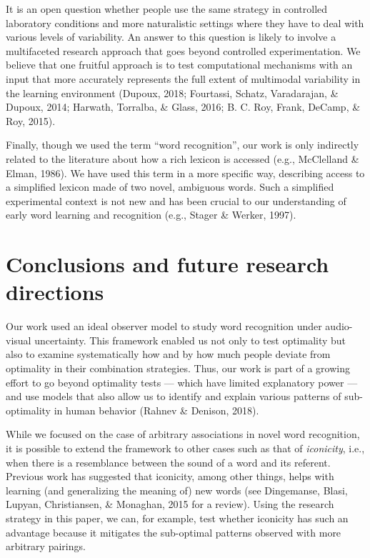 \documentclass[english,,man,floatsintext]{apa6}
\theoremstyle{definition}
\theoremstyle{definition}
\theoremstyle{definition}
\theoremstyle{remark}
\begin{document}
It is an open question whether people use the same strategy in
controlled laboratory conditions and more naturalistic settings where
they have to deal with various levels of variability. An answer to this
question is likely to involve a multifaceted research approach that goes
beyond controlled experimentation. We believe that one fruitful approach
is to test computational mechanisms with an input that more accurately
represents the full extent of multimodal variability in the learning
environment (Dupoux, 2018; Fourtassi, Schatz, Varadarajan, \& Dupoux,
2014; Harwath, Torralba, \& Glass, 2016; B. C. Roy, Frank, DeCamp, \&
Roy, 2015).

Finally, though we used the term \enquote{word recognition}, our work is
only indirectly related to the literature about how a rich lexicon is
accessed (e.g., McClelland \& Elman, 1986). We have used this term in a
more specific way, describing access to a simplified lexicon made of two
novel, ambiguous words. Such a simplified experimental context is not
new and has been crucial to our understanding of early word learning and
recognition (e.g., Stager \& Werker, 1997).

\section{Conclusions and future research
directions}\label{conclusions-and-future-research-directions}

Our work used an ideal observer model to study word recognition under
audio-visual uncertainty. This framework enabled us not only to test
optimality but also to examine systematically how and by how much people
deviate from optimality in their combination strategies. Thus, our work
is part of a growing effort to go beyond optimality tests --- which have
limited explanatory power --- and use models that also allow us to
identify and explain various patterns of sub-optimality in human
behavior (Rahnev \& Denison, 2018).

While we focused on the case of arbitrary associations in novel word
recognition, it is possible to extend the framework to other cases such
as that of \textit{iconicity}, i.e., when there is a resemblance between
the sound of a word and its referent. Previous work has suggested that
iconicity, among other things, helps with learning (and generalizing the
meaning of) new words (see Dingemanse, Blasi, Lupyan, Christiansen, \&
Monaghan, 2015 for a review). Using the research strategy in this paper,
we can, for example, test whether iconicity has such an advantage
because it mitigates the sub-optimal patterns observed with more
arbitrary pairings.
\end{document}
